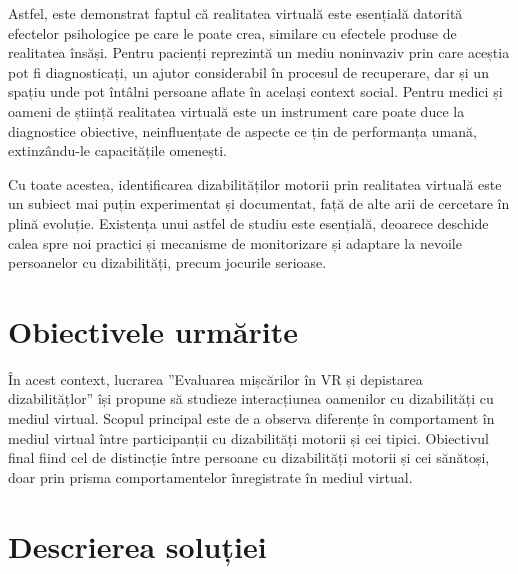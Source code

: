 \documentclass[12pt,a4paper]{report}
\theoremstyle{definition}
\theoremstyle{remark}
\begin{document}
Astfel, este demonstrat faptul că realitatea virtuală este esențială datorită efectelor psihologice pe care le poate crea, similare cu efectele produse de realitatea însăși. Pentru pacienți reprezintă un mediu noninvaziv prin care aceștia pot fi diagnosticați, un ajutor considerabil în procesul de recuperare, dar și un spațiu unde pot întâlni persoane aflate în același context social. Pentru medici și oameni de știință realitatea virtuală este un instrument care poate duce la diagnostice obiective, neinfluențate de aspecte ce țin de performanța umană, extinzându-le capacitățile omenești.

Cu toate acestea, identificarea dizabilităților motorii prin realitatea virtuală este un subiect mai puțin experimentat și documentat, față de alte arii de cercetare în plină evoluție. Existența unui astfel de studiu este esențială, deoarece deschide calea spre noi practici și mecanisme de monitorizare și adaptare la nevoile persoanelor cu dizabilități, precum jocurile serioase.



\section{Obiectivele urmărite}
În acest context, lucrarea ”Evaluarea mișcărilor în VR și depistarea dizabilitățlor” își propune să studieze interacțiunea oamenilor cu dizabilități cu mediul virtual. Scopul principal este de a observa diferențe în comportament în mediul virtual între participanții cu dizabilități motorii și cei tipici. Obiectivul final fiind cel de distincție între persoane cu dizabilități motorii și cei sănătoși, doar prin prisma comportamentelor înregistrate în mediul virtual.


\section{Descrierea soluției}
\end{document}
